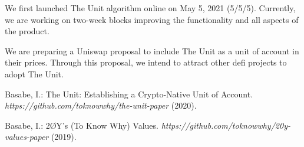 \documentclass[12pt]{article}
\begin{document}
We first launched The Unit algorithm online on May 5, 2021 (5/5/5). Currently, we are working on two-week blocks improving the functionality and all aspects of the product.

We are preparing a Uniswap proposal to include The Unit as a unit of account in their prices. Through this proposal, we intend to attract other defi projects to adopt The Unit.


\begin{thebibliography}{[BLSWZ9]}


 Basabe, I.: The Unit: Establishing a Crypto-Native Unit of Account. \emph{https://github.com/toknowwhy/the-unit-paper} (2020).


 Basabe, I.: 2ØY's (To Know Why) Values. \emph{https://github.com/toknowwhy/20y-values-paper} (2019).



\end{thebibliography}
\end{document}
